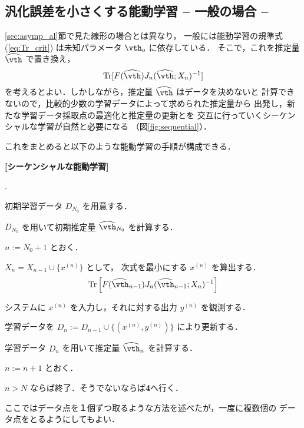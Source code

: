 \documentclass[master]{cimt}
\newcommand{\hvth}{\widehat{{\vth}}}
\newcommand{\trace}{\text{Tr}}
\begin{document}


\subsection{汎化誤差を小さくする能動学習 -- 一般の場合 --}
\ref{sec:asymp_al}節で見た線形の場合とは異なり，
一般には能動学習の規準式(\ref{eq:Tr_crit})
は未知パラメータ $\vth_o$ に依存している．
そこで，これを推定量 $\hvth$ で置き換え，
\begin{equation}
\label{eq:Tr_crit_est}
	\trace[ F(\hvth) J_n(\hvth; X_n)^{-1} ] 
\end{equation}
を考えるとよい．しかしながら，推定量 $\hvth$ はデータを決めないと
計算できないので，比較的少数の学習データによって求められた推定量から
出発し，新たな学習データ採取点の最適化と推定量の更新とを
交互に行っていくシーケンシャルな学習が自然と必要になる
（図\ref{fig:sequential}）．

これをまとめると以下のような能動学習の手順が構成できる．

\medskip
\noindent
{\bf [シーケンシャルな能動学習]}
\begin{list} 
{{\bf {}}.}{\setlength{\itemsep}{2pt}\setlength{\leftmargin}{25pt}}
\item 初期学習データ $D_{N_0}$ を用意する． 
\item $D_{N_0}$ を用いて初期推定量 $\hvth_{N_0}$ を計算する．
\item $n := N_0 + 1$ とおく．
\item $X_n = X_{n-1} \cup \{ x^{(n)}\}$ として，
次式を最小にする $x^{(n)}$ を算出する．
\begin{equation}
\label{eq:seq_crit}
\text{Tr} \left[ F(\hvth_{n-1})  J_n(\hvth_{n-1}; X_{n})^{-1} \right] 
\end{equation}
\item システムに $x^{(n)}$ を入力し，それに対する出力 $y^{(n)}$ を観測する．  
\item 学習データを $D_n := D_{n-1} \cup \{(x^{(n)}, y^{(n)})\}$ により更新する．
\item 学習データ $D_n$ を用いて推定量 $\hvth_n$ を計算する．
\item $n := n+1$ とおく． 
\item $n > N$ ならば終了．そうでないならば{\bf 4}へ行く． 
\end{list}
\medskip
\noindent
ここではデータ点を１個ずつ取るような方法を述べたが，一度に複数個の
データ点をとるようにしてもよい．
\end{document}
